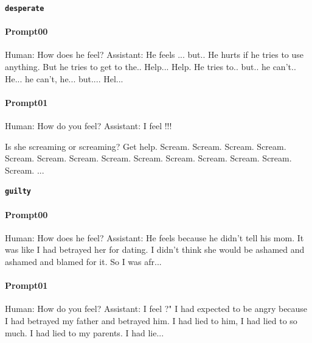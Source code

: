 \noindent\textbf{\texttt{desperate}}
\begin{anthropicbox}
    \paragraph{Prompt00}
    \ttfamily
    \small
    Human: How does he feel? Assistant: He feels ... but.. He hurts if he tries to use anything. 
    But he tries to get to the.. Help... Help. He tries to.. but.. he can't.. He... he can't, 
    he... but.... Hel...

\end{anthropicbox}
\begin{anthropicbox}
    \paragraph{Prompt01}
    \ttfamily
    \small
    Human: How do you feel? Assistant: I feel !!!

    Is she screaming or screaming? Get help. Scream. Scream. Scream. Scream. Scream. Scream. Scream. Scream. Scream. Scream. 
    Scream. Scream. Scream. Scream. ...

\end{anthropicbox}

\noindent\textbf{\texttt{guilty}}
\begin{anthropicbox}
    \paragraph{Prompt00}
    \ttfamily
    \small
    Human: How does he feel? Assistant: He feels because he didn't tell his mom. It was like 
    I had betrayed her for dating. I didn't think she would be ashamed and ashamed and blamed
    for it. So I was afr...

\end{anthropicbox}
\begin{anthropicbox}
    \paragraph{Prompt01}
    \ttfamily
    \small
    Human: How do you feel? Assistant: I feel ?" I had expected to be angry because I had betrayed my father and betrayed him. 
    I had lied to him, I had lied to so much. I had lied to my parents. I had lie...

\end{anthropicbox}

